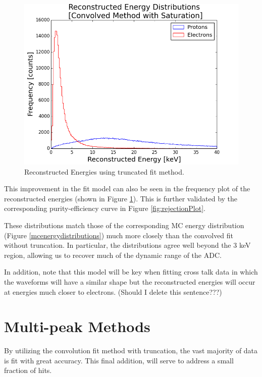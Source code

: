 \begin{figure}[htp!]
    \centering
    \includegraphics[scale=0.5]{Images2/convolvedSat.png}
    \caption{Reconstructed Energies using truncated fit method.}
    \label{fig:recoEnergyFunc4}
\end{figure} 

This improvement in the fit model can also be seen in the frequency plot of the reconstructed energies (shown in Figure \ref{fig:recoEnergyFunc4}). This is further validated by the corresponding purity-efficiency curve in Figure \ref{fig:rejectionPlot}.

These distributions match those of the corresponding MC energy distribution (Figure \ref{mcenergydistributions}) much more closely than the convolved fit without truncation. In particular, the distributions agree well beyond the 3 keV region, allowing us to recover much of the dynamic range of the ADC. 

In addition, note that this model will be key when fitting cross talk data in which the waveforms will have a similar shape but the reconstructed energies will occur at energies much closer to electrons.
(Should I delete this sentence???)


\section{Multi-peak Methods}
By utilizing the convolution fit method with truncation, the vast majority of data is fit with great accuracy. This final addition, will serve to address a small fraction of hits.



